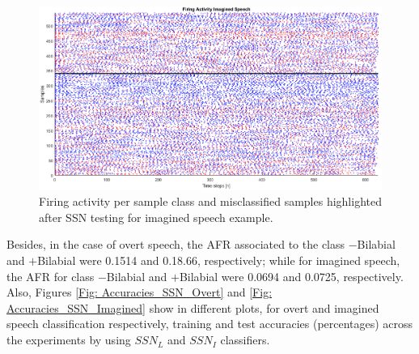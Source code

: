 \begin{figure}[h!]
	\centering
	\includegraphics[width=\linewidth]{Figures/FA_SSN_Imagined.png}
	\caption{Firing activity per sample class and misclassified samples highlighted after SSN testing for imagined speech example.}
	\label{Fig: FA_SSN_Imagined}
\end{figure}

Besides, in the case of overt speech, the AFR associated to the class $-$Bilabial and $+$Bilabial were 0.1514 and 0.18.66, respectively; while for imagined speech, the AFR for class $-$Bilabial and $+$Bilabial were 0.0694 and 0.0725, respectively. Also, Figures \ref{Fig: Accuracies_SSN_Overt} and \ref{Fig: Accuracies_SSN_Imagined} show in different plots, for overt and imagined speech classification respectively, training and test accuracies (percentages) across the experiments by using $SSN_{L}$ and $SSN_{I}$ classifiers.\\

